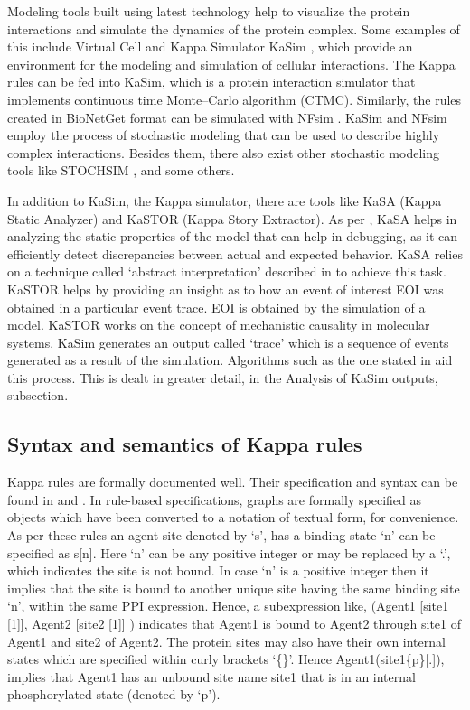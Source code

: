 \documentclass[msc,deptreport,ai]{infthesis}      %
\begin{document}
Modeling tools built using latest technology help to visualize the protein interactions and simulate the dynamics of the protein complex. Some examples of this include Virtual Cell \cite{vcell} and Kappa Simulator KaSim \cite{kasim}, which provide an environment for the modeling and simulation of cellular interactions. The Kappa rules can be fed into KaSim, which is a protein interaction simulator that implements continuous time Monte–Carlo algorithm (CTMC). Similarly, the rules created in BioNetGet \cite{bioNetGen} format can be simulated with NFsim \cite{nfsim}. KaSim and NFsim employ the process of stochastic modeling that can be used to describe highly complex interactions. Besides them, there also exist other stochastic modeling tools like STOCHSIM \cite{stochsim}, and some others.

In addition to KaSim, the Kappa simulator, there are tools like KaSA (Kappa Static Analyzer) and KaSTOR (Kappa Story Extractor). As per \cite{kappaPlatform}, KaSA helps in analyzing the static properties of the model that can help in debugging, as it can efficiently detect discrepancies between actual and expected behavior. KaSA relies on a technique called `abstract interpretation' described in \cite{kappaPlatform} to achieve this task. KaSTOR helps by providing an insight as to how an event of interest EOI was obtained in a particular event trace. EOI is obtained by the simulation of a model. KaSTOR works on the concept of mechanistic causality in molecular systems. KaSim generates an output called `trace' which is a sequence of events generated as a result of the simulation. Algorithms such as the one stated in \cite{danos2012graphs} aid this process. This is dealt in greater detail, in the Analysis of KaSim outputs, subsection.

\subsection{Syntax and semantics of Kappa rules}
Kappa rules are formally documented well. Their specification and syntax can be found in \cite{kasim} and \cite{kappaURL}. In rule-based specifications, graphs are formally specified as objects which have been converted to a notation of textual form, for convenience. As per these rules an agent site denoted  by `s', has a binding state `n' can be specified as s[n]. Here `n' can be any positive integer or may be replaced by a `.', which indicates the site is not bound. In case `n' is a positive integer then it implies that the site is bound to another unique site having the same binding site `n', within the same PPI expression. Hence, a subexpression like, (Agent1 [site1 [1]], Agent2 [site2 [1]] ) indicates that Agent1 is bound to Agent2 through site1 of Agent1 and site2 of Agent2. The protein sites may also have their own internal states which are specified within curly brackets `\{\}'. Hence Agent1(site1\{p\}[.]), implies that Agent1 has an unbound site name site1 that is in an internal phosphorylated state (denoted by `p'). 
\end{document}
